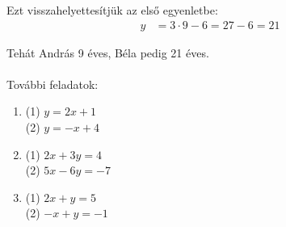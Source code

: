 \documentclass[12pt,a4paper]{article}
\begin{document}
\noindent Ezt visszahelyettesítjük az első egyenletbe:
\begin{align*}
	y &= 3 \cdot 9 - 6 = 27 - 6 = 21
\end{align*}

\noindent Tehát András 9 éves, Béla pedig 21 éves.
\\\\
\newpage
\noindent További feladatok:
\begin{enumerate}[label=\alph*]
  \item (1) $y=2x+1$\\
		(2) $y=-x+4$
  \item (1) $2x+3y=4$\\
		(2) $5x-6y=-7$
  \item (1) $2x+y=5$\\
		(2) $-x+y=-1$
\end{enumerate}
\end{document}

